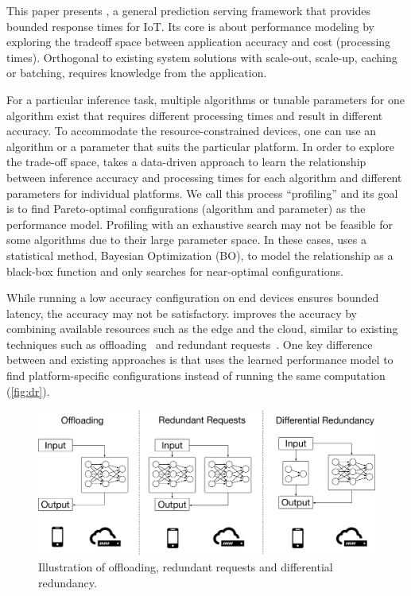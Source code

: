 This paper presents \sysname{}, a general prediction serving framework that
provides bounded response times for IoT. Its core is about performance modeling
by exploring the tradeoff space between application accuracy and cost
(processing times). Orthogonal to existing system solutions with scale-out,
scale-up, caching or batching, \sysname{} requires knowledge from the
application.

 For a particular inference task, multiple
algorithms or tunable parameters for one algorithm exist that requires different
processing times and result in different accuracy. To accommodate the
resource-constrained devices, one can use an algorithm or a parameter that suits
the particular platform. In order to explore the trade-off space, \sysname{}
takes a data-driven approach to learn the relationship between inference
accuracy and processing times for each algorithm and different parameters for
individual platforms. We call this process ``profiling'' and its goal is to find
Pareto-optimal configurations (algorithm and parameter) as the performance
model. Profiling with an exhaustive search may not be feasible for some
algorithms due to their large parameter space. In these cases, \sysname{} uses a
statistical method, Bayesian Optimization (BO), to model the relationship as a
black-box function and only searches for near-optimal configurations.

 While running a low accuracy configuration
on end devices ensures bounded latency, the accuracy may not be
satisfactory. \sysname{} improves the accuracy by combining available resources
such as the edge and the cloud, similar to existing techniques such as
offloading~\cite{chun2011clonecloud,cuervo2010maui} and redundant
requests~\cite{ananthanarayanan2013effective, dean2013tail,
  gordon2015accelerating, vulimiri2013low}. One key difference between
\sysname{} and existing approaches is that \sysname{} uses the learned
performance model to find platform-specific configurations instead of running
the same computation (\autoref{fig:dr}).

\begin{figure}
  \centering
  \includegraphics[width=\columnwidth]{figures/dr.pdf}
  \caption{Illustration of offloading, redundant requests and differential
    redundancy.}
  \label{fig:dr}
\end{figure}

